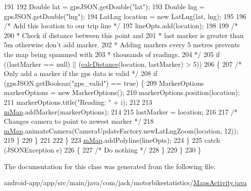 \begin{DoxyCode}
191 
192                     Double lat = gpsJSON.getDouble(\textcolor{stringliteral}{"lat"});
193                     Double lng = gpsJSON.getDouble(\textcolor{stringliteral}{"lng"});
194                     LatLng location = \textcolor{keyword}{new} LatLng(lat, lng);
195 
196                     \textcolor{comment}{/* Add this location to our trip line */}
197                     lineOpts.add(location);
198 
199                     \textcolor{comment}{/*}
200 \textcolor{comment}{                     * Check if distance between this point and}
201 \textcolor{comment}{                     * last marker is greater than 5m otherwise don't add marker.}
202 \textcolor{comment}{                     * Adding markers every 5 metres prevents the map being spammed with}
203 \textcolor{comment}{                     * thousands of readings.}
204 \textcolor{comment}{                     */}
205                     \textcolor{keywordflow}{if} ((lastMarker == null) || (\hyperlink{classcom_1_1jack_1_1motorbikestatistics_1_1_maps_activity_af4feb7617c02a59c62d6e9257914e997}{calcDistance}(location, lastMarker) > 5))
206                     \{
207                         \textcolor{comment}{/* Only add a marker if the gps data is valid */}
208                         \textcolor{keywordflow}{if} (gpsJSON.getBoolean(\textcolor{stringliteral}{"gps\_valid"}) == \textcolor{keyword}{true}) \{
209                             MarkerOptions markerOptions = \textcolor{keyword}{new} MarkerOptions();
210                             markerOptions.position(location);
211                             markerOptions.title(\textcolor{stringliteral}{"Reading: "} + i);
212 
213                             \hyperlink{classcom_1_1jack_1_1motorbikestatistics_1_1_maps_activity_aaace5219464acf3df9ac5e9ce913eef5}{mMap}.addMarker(markerOptions);
214 
215                             lastMarker = location;
216 
217                             \textcolor{comment}{/* Changes camera to point to newest marker */}
218                             \hyperlink{classcom_1_1jack_1_1motorbikestatistics_1_1_maps_activity_aaace5219464acf3df9ac5e9ce913eef5}{mMap}.animateCamera(CameraUpdateFactory.newLatLngZoom(location, 12));
219                         \}
220                     \}
221 
222                 \}
223                 \hyperlink{classcom_1_1jack_1_1motorbikestatistics_1_1_maps_activity_aaace5219464acf3df9ac5e9ce913eef5}{mMap}.addPolyline(lineOpts);
224             \}
225             \textcolor{keywordflow}{catch} (JSONException e)
226             \{
227                 \textcolor{comment}{/* Do nothing */}
228             \}
229         \}
230     \}
\end{DoxyCode}


The documentation for this class was generated from the following file\+:\begin{DoxyCompactItemize}
\item 
android-\/app/app/src/main/java/com/jack/motorbikestatistics/\hyperlink{_maps_activity_8java}{Maps\+Activity.\+java}\end{DoxyCompactItemize}
